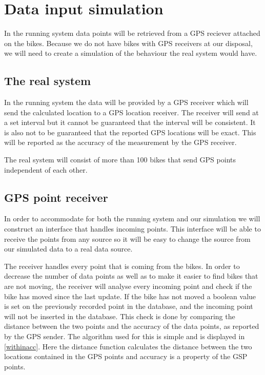 \section{Data input simulation}\label{design:datasimulation}
In the running system data points will be retrieved from a GPS reciever attached on the bikes.
Because we do not have bikes with GPS receivers at our disposal, we will need to create a simulation of the behaviour the real system would have.

\subsection{The real system}
In the running system the data will be provided by a GPS receiver which will send the calculated location to a GPS location receiver.
The receiver will send at a set interval but it cannot be guaranteed that the interval will be consistent.
It is also not to be guaranteed that the reported GPS locations will be exact.
This will be reported as the accuracy of the measurement by the GPS receiver.

The real system will consist of more than 100 bikes that send GPS points independent of each other.

\subsection{GPS point receiver}\label{design:datareceiver}
In order to accommodate for both the running system and our simulation we will construct an interface that handles incoming points.
This interface will be able to receive the points from any source so it will be easy to change the source from our simulated data to a real data source.

The receiver handles every point that is coming from the bikes.
In order to decrease the number of data points as well as to make it easier to find bikes that are not moving, the receiver will analyse every incoming point and check if the bike has moved since the last update.
If the bike has not moved a boolean value is set on the previously recorded point in the database, and the incoming point will not be inserted in the database.
This check is done by comparing the distance between the two points and the accuracy of the data points, as reported by the GPS sender.
The algorithm used for this is simple and is displayed in \cref{withinacc}.
Here the distance function calculates the distance between the two locations contained in the GPS points and accuracy is a property of the GSP points.

